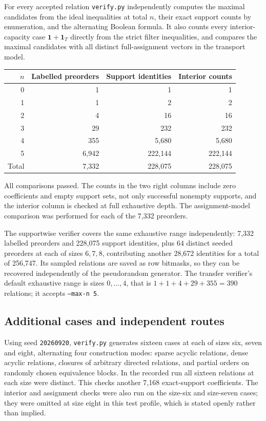\documentclass[11pt]{article}
\numberwithin{equation}{section}
\theoremstyle{definition}
\theoremstyle{remark}
\newcommand{\one}{\mathbf 1}
\begin{document}
For every accepted relation \texttt{verify.py} independently computes the
maximal candidates from the ideal inequalities at total $n$, their exact
support counts by enumeration, and the alternating Boolean formula. It also
counts every interior-capacity case $\one+\one_T$ directly from the strict
filter inequalities, and compares the maximal candidates with all distinct
full-assignment vectors in the transport model.

\begin{center}
\begin{tabular}{@{}r r r r@{}}
\toprule
$n$ & Labelled preorders & Support identities & Interior counts\\
\midrule
0 & 1 & 1 & 1\\
1 & 1 & 2 & 2\\
2 & 4 & 16 & 16\\
3 & 29 & 232 & 232\\
4 & 355 & 5,680 & 5,680\\
5 & 6,942 & 222,144 & 222,144\\
\midrule
Total & 7,332 & 228,075 & 228,075\\
\bottomrule
\end{tabular}
\end{center}
All comparisons passed. The counts in the two right columns include zero
coefficients and empty support sets, not only successful nonempty supports,
and the interior column is checked at full exhaustive depth. The
assignment-model comparison was performed for each of the 7,332 preorders.

The supportwise verifier covers the same exhaustive range independently:
7,332 labelled preorders and 228,075 support identities, plus $64$ distinct
seeded preorders at each of sizes $6,7,8$, contributing another 28,672
identities for a total of 256,747. Its sampled relations are saved as row
bitmasks, so they can be recovered independently of the pseudorandom
generator. The transfer verifier's default exhaustive range is sizes
$0,\ldots,4$, that is $1+1+4+29+355=390$ relations; it accepts
\texttt{--max-n 5}.

\subsection{Additional cases and independent routes}

Using seed \texttt{20260920}, \texttt{verify.py} generates sixteen cases at
each of sizes six, seven and eight, alternating four construction modes:
sparse acyclic relations, dense acyclic relations, closures of arbitrary
directed relations, and partial orders on randomly chosen equivalence blocks.
In the recorded run all sixteen relations at each size were distinct. This
checks another 7,168 exact-support coefficients. The interior and assignment
checks were also run on the size-six and size-seven cases; they were omitted
at size eight in this test profile, which is stated openly rather than
implied.
\end{document}
